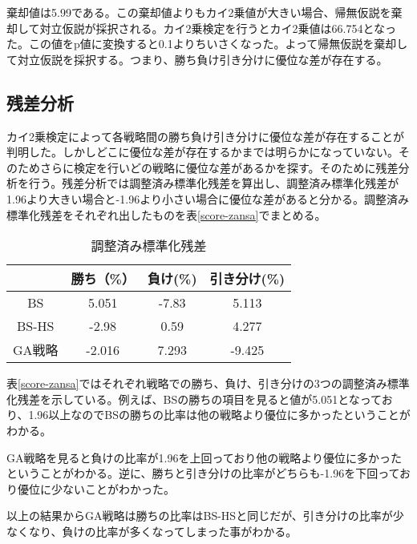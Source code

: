棄却値は5.99である。この棄却値よりもカイ2乗値が大きい場合、帰無仮説を棄却して対立仮説が採択される。カイ2乗検定を行うとカイ2乗値は66.754となった。この値をp値に変換すると0.1よりちいさくなった。よって帰無仮説を棄却して対立仮説を採択する。つまり、勝ち負け引き分けに優位な差が存在する。

\subsection{残差分析}
カイ2乗検定によって各戦略間の勝ち負け引き分けに優位な差が存在することが判明した。しかしどこに優位な差が存在するかまでは明らかになっていない。そのためさらに検定を行いどの戦略に優位な差があるかを探す。そのために残差分析を行う。残差分析では調整済み標準化残差を算出し、調整済み標準化残差が1.96より大きい場合と-1.96より小さい場合に優位な差があると分かる。調整済み標準化残差をそれぞれ出したものを表\ref{score-zansa}でまとめる。

\begin{table}[H]
 \caption{調整済み標準化残差}
 \begin{center}
  \begin{tabular}{|c|c|c|c|}
  \hline   & 勝ち（\%） & 負け(\%)  & 引き分け(\%) \\
  \hline BS & 5.051 & -7.83 & 5.113 \\
  \hline BS-HS & -2.98 & 0.59 & 4.277 \\
  \hline GA戦略 & -2.016 & 7.293 & -9.425 \\
  \hline
  \end{tabular}
  \label{tab:score-zansa}
 \end{center}
\end{table}

表\ref{score-zansa}ではそれぞれ戦略での勝ち、負け、引き分けの3つの調整済み標準化残差を示している。例えば、BSの勝ちの項目を見ると値が5.051となっており、1.96以上なのでBSの勝ちの比率は他の戦略より優位に多かったということがわかる。

GA戦略を見ると負けの比率が1.96を上回っており他の戦略より優位に多かったということがわかる。逆に、勝ちと引き分けの比率がどちらも-1.96を下回っており優位に少ないことがわかった。

以上の結果からGA戦略は勝ちの比率はBS-HSと同じだが、引き分けの比率が少なくなり、負けの比率が多くなってしまった事がわかる。
